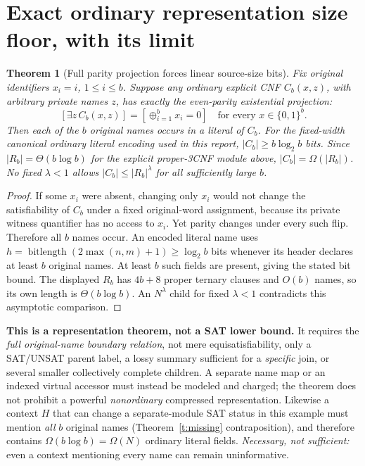 \documentclass[11pt]{article}
\newtheorem{theorem}{Theorem}
\begin{document}
\section{Exact ordinary representation size floor, with its limit}
\begin{theorem}[Full parity projection forces linear source-size bits]
\label{t:fields}
Fix original identifiers $x_i=i$, $1\le i\le b$.
Suppose any ordinary \emph{explicit} CNF $C_b(x,z)$, with
arbitrary private names $z$, has \emph{exactly} the even-parity
existential projection:
\[
 [\exists z\,C_b(x,z)]=[\oplus_{i=1}^b x_i=0]
 \quad\text{for every }x\in\{0,1\}^b .
\]
Then each of the $b$ original names occurs in a literal
of $C_b$. For the fixed-width canonical ordinary literal encoding
used in this report, $|C_b|\ge b\log_2 b$ bits.
Since $|R_b|=\Theta(b\log b)$ for the explicit proper-3CNF
module above, $|C_b|=\Omega(|R_b|)$.
No fixed $\lambda<1$ allows $|C_b|\le |R_b|^\lambda$
for all sufficiently large $b$.
\end{theorem}
\begin{proof}
If some $x_i$ were absent, changing only $x_i$ would not change the
satisfiability of $C_b$ under a fixed original-word assignment,
because its private witness quantifier has no access to $x_i$.
Yet parity changes under every such flip. Therefore all $b$
names occur. An encoded literal name uses
$h=\operatorname{bitlength}(2\max(n,m)+1)\ge\log_2 b$
bits whenever its header declares at least $b$ original names.
At least $b$ such fields are present, giving the stated bit bound.
The displayed $R_b$ has $4b+8$ proper ternary clauses and
$O(b)$ names, so its own length is $\Theta(b\log b)$.
An $N^\lambda$ child for fixed $\lambda<1$ contradicts
this asymptotic comparison. \end{proof}

\noindent\textbf{This is a representation theorem, not a SAT lower bound.}
It requires the \emph{full original-name boundary relation}, not
mere equisatisfiability, only a SAT/UNSAT parent label, a lossy
summary sufficient for a \emph{specific} join, or several smaller
collectively complete children. A separate name map or an indexed
virtual accessor must instead be modeled and charged;
the theorem does not prohibit a powerful \emph{nonordinary} compressed
representation. Likewise a context $H$ that can change a
separate-module SAT status in this example must mention \emph{all}
$b$ original names (Theorem~\ref{t:missing} contraposition),
and therefore contains $\Omega(b\log b)=\Omega(N)$
ordinary literal fields. \emph{Necessary, not sufficient:}
even a context mentioning every name can remain uninformative.
\end{document}
